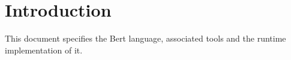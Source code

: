 \section{Introduction}

This document specifies the Bert language, associated tools and the runtime implementation of it.

